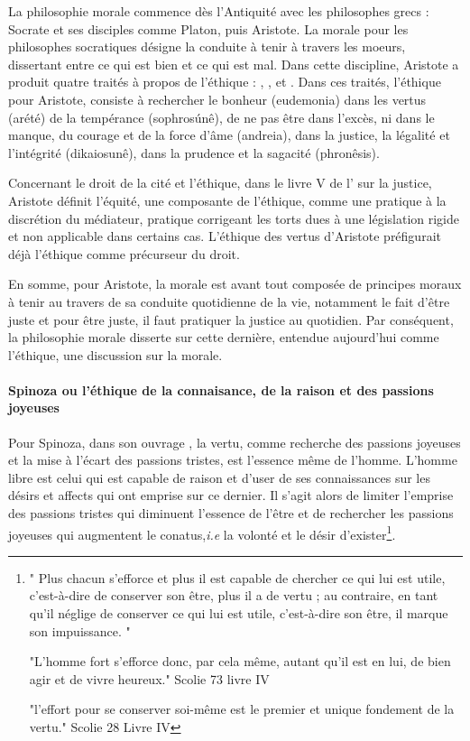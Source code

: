 La philosophie morale commence dès l'Antiquité avec les philosophes grecs : Socrate et ses disciples comme Platon, puis Aristote. La morale pour les philosophes socratiques désigne la conduite à tenir à travers les moeurs, dissertant entre ce qui est bien et ce qui est mal. Dans cette discipline, Aristote a produit quatre traités à propos de l'éthique : , ,  et . Dans ces traités, l'éthique pour Aristote, consiste à rechercher le bonheur (eudemonia) dans les vertus (arété) de la tempérance (sophrosúnê), de ne pas être dans l'excès, ni dans le manque, du courage et de la force d'âme (andreia), dans la justice, la légalité et l'intégrité (dikaiosunê), dans la prudence et la sagacité (phronêsis).

Concernant le droit de la cité et l'éthique, dans le livre V de l' sur la justice, Aristote définit l'équité, une composante de l'éthique, comme une pratique à la discrétion du médiateur, pratique corrigeant les torts dues à une législation rigide et non applicable dans certains cas. L'éthique des vertus d'Aristote préfigurait déjà l'éthique comme précurseur du droit.

En somme, pour Aristote, la morale est avant tout composée de principes moraux à tenir au travers de sa conduite quotidienne de la vie, notamment le fait d'être juste et pour être juste, il faut pratiquer la justice au quotidien. Par conséquent, la philosophie morale disserte sur cette dernière, entendue aujourd'hui comme l'éthique, une discussion sur la morale.


\paragraph{Spinoza ou l'éthique de la connaisance, de la raison et des passions joyeuses}


Pour Spinoza, dans son ouvrage , la vertu, comme recherche des passions joyeuses et la mise à l'écart des passions tristes, est l'essence même de l'homme. L'homme libre est celui qui est capable de raison et d'user de ses connaissances sur les désirs et affects qui ont emprise sur ce dernier. Il s'agit alors de limiter l'emprise des passions tristes qui diminuent l'essence de l'être et de rechercher les passions joyeuses qui augmentent le conatus,\textit{i.e} la volonté et le désir d'exister\footnote{"
Plus chacun s'efforce et plus il est capable de chercher ce qui lui est utile, c'est-à-dire de conserver son être, plus il a de vertu ; au contraire, en tant qu'il néglige de conserver ce qui lui est utile, c'est-à-dire son être, il marque son impuissance.
"

"L'homme fort s'efforce donc, par cela même, autant qu'il est en lui, de bien agir et de vivre heureux." Scolie 73 livre IV

"l'effort pour se conserver soi-même est le premier et unique fondement de la vertu." Scolie 28 Livre IV}.



